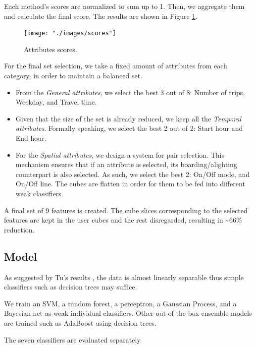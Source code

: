 \documentclass{article}
\begin{document}
Each method's scores are normalized to sum up to 1. Then, we aggregate them and calculate the final score. The results are shown in Figure \ref{fig:classification/scores}. 

\begin{figure}[H]
  \centering
  \texttt{[image: "./images/scores"]}
  \caption{Attributes scores.}
  \label{fig:classification/scores}
\end{figure}

For the final set selection, we take a fixed amount of attributes from each category, in order to maintain a balanced set. 

\begin{itemize}

\item From the \textit{General attributes}, we select the best 3 out of 8: Number of trips, Weekday, and Travel time. 

\item Given that the size of the set is already reduced, we keep all the \textit{Temporal attributes}. Formally speaking, we select the best 2 out of 2: Start hour and End hour. 

\item For the \textit{Spatial attributes}, we design a system for pair selection. This mechanism ensures that if an attribute is selected, its boarding/alighting counterpart is also selected. As such, we select the best 2: On/Off mode, and On/Off line. The cubes are flatten in order for them to be fed into different weak classifiers. 

\end{itemize}

A final set of 9 features is created. The cube slices corresponding to the selected features are kept in the user cubes and the rest disregarded, resulting in \textasciitilde 66\% reduction. 

\subsection{Model} %
As suggested by Tu's results \cite{tu2016impact}, the data is almost linearly separable thus simple classifiers such as decision trees may suffice.

We train an SVM, a random forest, a perceptron, a Gaussian Process, and a Bayesian net as weak individual classifiers. Other out of the box ensemble models are trained such as AdaBoost using decision trees. 
 
The seven classifiers are evaluated separately. 
\end{document}

